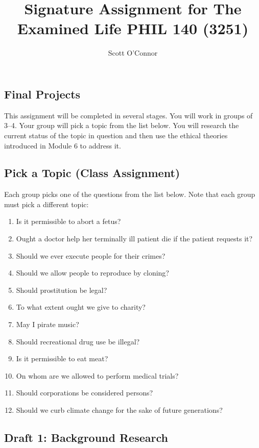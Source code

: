 \documentclass[10pt]{article}
\title{Signature Assignment for The Examined Life PHIL 140 (3251)}
\author{Scott O’Connor}
\providecommand{\tightlist}{%
  \setlength{\itemsep}{0pt}\setlength{\parskip}{0pt}}
\begin{document}
\maketitle

\subsection{Final Projects}\label{final-projects}

This assignment will be completed in several stages. You will work in groups of 3--4.
Your group will pick a topic from the list below. You will research the
current status of the topic in question and then use the ethical
theories introduced in Module 6 to address it.

\subsection{Pick a Topic (Class
Assignment)}\label{pick-a-topic-class-assignment}

Each group picks one of the questions from the list below. Note that
each group must pick a different topic:

\begin{enumerate}
\def\labelenumi{\arabic{enumi}.}
\tightlist
\item
  Is it permissible to abort a fetus?
\item
  Ought a doctor help her terminally ill patient die if the patient
  requests it?
\item
  Should we ever execute people for their crimes?
\item
  Should we allow people to reproduce by cloning?
\item
  Should prostitution be legal?
\item
  To what extent ought we give to charity?
\item
  May I pirate music?
\item
  Should recreational drug use be illegal?
\item
  Is it permissible to eat meat?
\item
  On whom are we allowed to perform medical trials?
\item
  Should corporations be considered persons?
\item
  Should we curb climate change for the sake of future generations?
\end{enumerate}

\subsection{Draft 1: Background
Research}\label{draft-1-background-research}
\end{document}
